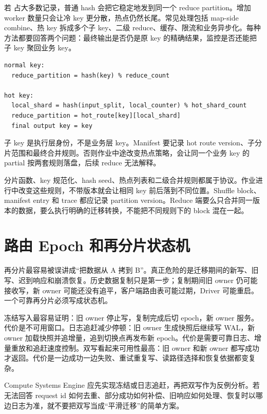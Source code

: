 若  占大多数记录，普通 hash 会把它稳定地发到同一个 reduce partition。增加 worker 数量只会让冷 key 更分散，热点仍然长尾。常见处理包括 map-side combine、热 key 拆成多个子 key、二级 reduce、缓存、限流和业务异步化。每种方法都要回答两个问题：最终输出是否仍是原 key 的精确结果，监控是否还能把子 key 聚回业务 key。

\begin{lstlisting}[numbers=none,caption={热点 key 拆分的执行身份和业务身份要分开}]
normal key:
  reduce_partition = hash(key) % reduce_count

hot key:
  local_shard = hash(input_split, local_counter) % hot_shard_count
  reduce_partition = hot_route[key][local_shard]
  final output key = key
\end{lstlisting}

子 key 是执行层身份，不是业务层 key。Manifest 要记录 hot route version、子分片范围和最终合并规则。否则作业中途改变热点策略，会让同一个业务 key 的 partial 按两套规则落盘，后续 reduce 无法解释。

分片函数、key 规范化、hash seed、热点列表和二级合并规则都属于协议。作业进行中改变这些规则，不带版本就会让相同 key 前后落到不同位置。Shuffle block、manifest entry 和 trace 都应记录 partition version。Reduce 端要么只合并同一版本的数据，要么执行明确的迁移转换，不能把不同规则下的 block 混在一起。

\section{路由 Epoch 和再分片状态机}

再分片最容易被误讲成“把数据从 A 拷到 B”。真正危险的是迁移期间的新写、旧写、迟到响应和崩溃恢复。历史数据复制只是第一步；复制期间旧 owner 仍可能接收写，新 owner 可能还没有追平，客户端路由表可能过期，Driver 可能重启。一个可靠再分片必须写成状态机。

冻结写入最容易证明：旧 owner 停止写，复制完成后切 epoch，新 owner 服务。代价是不可用窗口。日志追赶减少停顿：旧 owner 生成快照后继续写 WAL，新 owner 加载快照并追增量，追到切换点再发布新 epoch。代价是需要可靠日志、增量重放和追赶速度控制。双写看起来可用性最高：旧 owner 和新 owner 都写成功才返回。代价是一边成功一边失败、重试重复写、读路径选择和恢复依据都变复杂。

Compute Systems Engine 应先实现冻结或日志追赶，再把双写作为反例分析。若无法回答 request id 如何去重、部分成功如何补偿、旧响应如何处理、恢复时以哪边日志为准，就不要把双写当成“平滑迁移”的简单方案。

